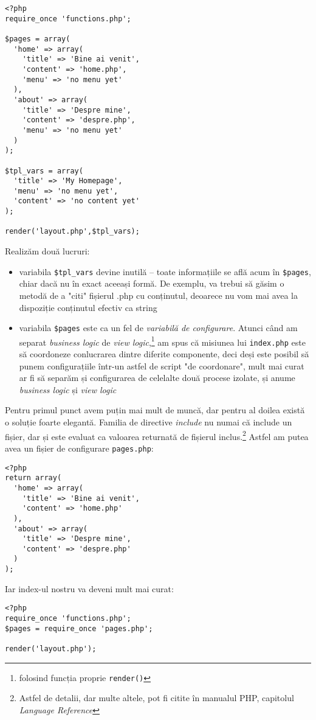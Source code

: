 \begin{lstlisting}
<?php
require_once 'functions.php';

$pages = array(
  'home' => array(
	'title' => 'Bine ai venit',
	'content' => 'home.php',
	'menu' => 'no menu yet'
  ),
  'about' => array(
	'title' => 'Despre mine',
	'content' => 'despre.php',
	'menu' => 'no menu yet'
  )
);

$tpl_vars = array(
  'title' => 'My Homepage',
  'menu' => 'no menu yet',
  'content' => 'no content yet'
);

render('layout.php',$tpl_vars);
\end{lstlisting}
Realizăm două lucruri:
\begin{itemize}
\item variabila \texttt{\$tpl\_vars} devine inutilă -- toate informațiile se află acum în \texttt{\$pages},
chiar dacă nu în exact aceeași formă. De exemplu, va trebui să găsim o metodă de a "citi" fișierul .php
cu conținutul, deoarece nu vom mai avea la dispoziție conținutul efectiv ca string
\item variabila \texttt{\$pages} este ca un fel de \textit{variabilă de configurare}.
Atunci când am separat \textit{business logic} de \textit{view logic},\footnote{folosind
funcția proprie \texttt{render()}} am spus că misiunea lui \texttt{index.php} este să
coordoneze conlucrarea dintre diferite componente, deci deși este posibil să
punem configurațiile într-un astfel de script "de coordonare", mult mai curat ar fi
să separăm și configurarea de celelalte două procese izolate, și anume \textit{business logic}
și \textit{view logic}
\end{itemize}
Pentru primul punct avem puțin mai mult de muncă, dar pentru al doilea există o soluție
foarte elegantă. Familia de directive \textit{include} nu numai că include
un fișier, dar și este evaluat ca valoarea returnată de fișierul inclus.\footnote{Astfel
de detalii, dar multe altele, pot fi citite în manualul PHP, capitolul
\textit{Language Reference}} Astfel
am putea avea un fișier de configurare \texttt{pages.php}:
\begin{lstlisting}[title=pages.php]
<?php
return array(
  'home' => array(
	'title' => 'Bine ai venit',
	'content' => 'home.php'
  ),
  'about' => array(
	'title' => 'Despre mine',
	'content' => 'despre.php'
  )
);
\end{lstlisting}
Iar index-ul nostru va deveni mult mai curat:
\begin{lstlisting}
<?php
require_once 'functions.php';
$pages = require_once 'pages.php';

render('layout.php');
\end{lstlisting}

